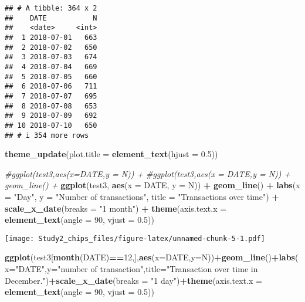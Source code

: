\documentclass[
]{article}
\newenvironment{Shaded}{\begin{snugshade}}{\end{snugshade}}
\newcommand{\AttributeTok}[1]{\textcolor[rgb]{0.13,0.29,0.53}{#1}}
\newcommand{\CommentTok}[1]{\textcolor[rgb]{0.56,0.35,0.01}{\textit{#1}}}
\newcommand{\DecValTok}[1]{\textcolor[rgb]{0.00,0.00,0.81}{#1}}
\newcommand{\FloatTok}[1]{\textcolor[rgb]{0.00,0.00,0.81}{#1}}
\newcommand{\FunctionTok}[1]{\textcolor[rgb]{0.13,0.29,0.53}{\textbf{#1}}}
\newcommand{\NormalTok}[1]{#1}
\newcommand{\SpecialCharTok}[1]{\textcolor[rgb]{0.81,0.36,0.00}{\textbf{#1}}}
\newcommand{\StringTok}[1]{\textcolor[rgb]{0.31,0.60,0.02}{#1}}
\begin{document}
\begin{verbatim}
## # A tibble: 364 x 2
##    DATE           N
##    <date>     <int>
##  1 2018-07-01   663
##  2 2018-07-02   650
##  3 2018-07-03   674
##  4 2018-07-04   669
##  5 2018-07-05   660
##  6 2018-07-06   711
##  7 2018-07-07   695
##  8 2018-07-08   653
##  9 2018-07-09   692
## 10 2018-07-10   650
## # i 354 more rows
\end{verbatim}

\begin{Shaded}
\begin{Highlighting}[]
\FunctionTok{theme\_update}\NormalTok{(}\AttributeTok{plot.title =} \FunctionTok{element\_text}\NormalTok{(}\AttributeTok{hjust =} \FloatTok{0.5}\NormalTok{))}

\CommentTok{\#ggplot(test3,aes(x=DATE,y = N)) + }
\CommentTok{\#ggplot(test3,aes(x = DATE,y = N)) + geom\_line() +}
\FunctionTok{ggplot}\NormalTok{(test3, }\FunctionTok{aes}\NormalTok{(}\AttributeTok{x =}\NormalTok{ DATE, }\AttributeTok{y =}\NormalTok{ N)) }\SpecialCharTok{+}
\FunctionTok{geom\_line}\NormalTok{() }\SpecialCharTok{+}
\FunctionTok{labs}\NormalTok{(}\AttributeTok{x =} \StringTok{"Day"}\NormalTok{, }\AttributeTok{y =} \StringTok{"Number of transactions"}\NormalTok{, }\AttributeTok{title =} \StringTok{"Transactions over time"}\NormalTok{) }\SpecialCharTok{+}
\FunctionTok{scale\_x\_date}\NormalTok{(}\AttributeTok{breaks =} \StringTok{"1 month"}\NormalTok{) }\SpecialCharTok{+}
\FunctionTok{theme}\NormalTok{(}\AttributeTok{axis.text.x =} \FunctionTok{element\_text}\NormalTok{(}\AttributeTok{angle =} \DecValTok{90}\NormalTok{, }\AttributeTok{vjust =} \FloatTok{0.5}\NormalTok{))}
\end{Highlighting}
\end{Shaded}

\texttt{[image: Study2\_chips\_files/figure-latex/unnamed-chunk-5-1.pdf]}

\begin{Shaded}
\begin{Highlighting}[]
\FunctionTok{ggplot}\NormalTok{(test3[}\FunctionTok{month}\NormalTok{(DATE)}\SpecialCharTok{==}\DecValTok{12}\NormalTok{,],}\FunctionTok{aes}\NormalTok{(}\AttributeTok{x=}\NormalTok{DATE,}\AttributeTok{y=}\NormalTok{N))}\SpecialCharTok{+}\FunctionTok{geom\_line}\NormalTok{()}\SpecialCharTok{+}\FunctionTok{labs}\NormalTok{(}\AttributeTok{x=}\StringTok{"DATE"}\NormalTok{,}\AttributeTok{y=}\StringTok{"number of transaction"}\NormalTok{,}\AttributeTok{title=}\StringTok{"Transaction over time in December."}\NormalTok{)}\SpecialCharTok{+}\FunctionTok{scale\_x\_date}\NormalTok{(}\AttributeTok{breaks =} \StringTok{"1 day"}\NormalTok{)}\SpecialCharTok{+}\FunctionTok{theme}\NormalTok{(}\AttributeTok{axis.text.x =} \FunctionTok{element\_text}\NormalTok{(}\AttributeTok{angle =} \DecValTok{90}\NormalTok{, }\AttributeTok{vjust =} \FloatTok{0.5}\NormalTok{))}
\end{Highlighting}
\end{Shaded}
\end{document}
